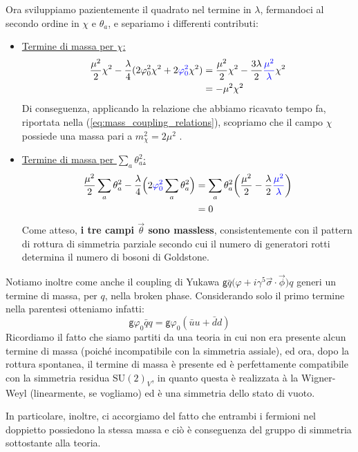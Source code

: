 \documentclass[../main.tex]{subfiles}
\begin{document}
Ora sviluppiamo pazientemente il quadrato nel termine in $\lambda$, fermandoci al secondo ordine in $\chi$ e $\theta_a$, e separiamo i differenti contributi:
\begin{itemize}
    \item \underline{Termine di massa per $\chi$:}
    \begin{align*}
        \frac{\mu^2}{2}\chi^2-\frac{\lambda}{4}(2\varphi_0^2\chi^2 + 2\textcolor{blue}{\varphi_0^2}\chi^2) &= \frac{\mu^2}{2}\chi^2-\frac{3\lambda}{2}\textcolor{blue}{\frac{\mu^2}{\lambda}}\chi^2 \\
        &= -\mu^2\chi^2
    \end{align*}
    Di conseguenza, applicando la relazione che abbiamo ricavato tempo fa, riportata nella (\ref{eq:mass_coupling_relations}), scopriamo che il campo $\chi$ possiede una massa pari a $\boxed{m_\chi^2=2\mu^2}$ .
    
    \item \underline{Termine di massa per $\sum_a\theta_a^2$:}
    \begin{align*}
        \frac{\mu^2}{2}\sum_a\theta_a^2-\frac{\lambda}{4}\Big(2\textcolor{blue}{\varphi_0^2}\sum_a\theta_a^2\Big) &= \sum_a\theta_a^2\bigg(\frac{\mu^2}{2} - \frac{\lambda}{2}\textcolor{blue}{\frac{\mu^2}{\lambda}}\bigg) \\
        &= 0
    \end{align*}
    Come atteso, \textbf{i tre campi $\Vec{\theta}$ sono massless}, consistentemente con il pattern di rottura di simmetria parziale secondo cui il numero di generatori rotti determina il numero di bosoni di Goldstone.
\end{itemize}

Notiamo inoltre come anche il coupling di Yukawa $\mathsf{g}{\bar q\big(\varphi +i\gamma^5\Vec{\sigma}\cdot\vec{\phi}\big) q}$ generi un termine di massa, per $q$, nella broken phase. Considerando solo il primo termine nella parentesi otteniamo infatti:
\[
\mathsf{g}\varphi_0\bar qq = \mathsf{g}\varphi_0(\bar uu + \bar dd)
\]
Ricordiamo il fatto che siamo partiti da una teoria in cui non era presente alcun termine di massa (poiché incompatibile con la simmetria assiale), ed ora, dopo la rottura spontanea, il termine di massa è presente ed è perfettamente compatibile con la simmetria residua SU$(2)_V$, in quanto questa è realizzata à la Wigner-Weyl (linearmente, se vogliamo) ed è una simmetria dello stato di vuoto. 

In particolare, inoltre, ci accorgiamo del fatto che entrambi i fermioni nel doppietto possiedono la stessa massa e ciò è conseguenza del gruppo di simmetria sottostante alla teoria.
\end{document}
